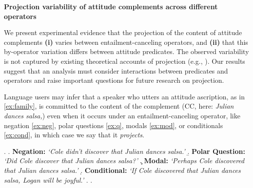 \documentclass[12pt, a4paper]{article}
\begin{document}

\enablehyphenation

\begin{center}
	\textbf{\large%
		Projection variability of attitude complements across different operators}
\end{center}

\vspace{-.8\baselineskip}
\noindent 
	We present experimental evidence that the projection of the content of attitude complements \textbf{(i)} varies between entailment-canceling operators, and \textbf{(ii)} that this by-operator variation differs between attitude predicates.
	The observed variability is not captured by existing theoretical accounts of projection
	(e.g., \citealt{heim_projection_1983,van_der_sandt_presupposition_1992,abrusan_predicting_2011,schlenker_triggering_2021}).
	Our results suggest that an analysis must consider interactions between predicates and operators and raise important questions for future research on projection.

	Language users may infer that a speaker who utters an attitude ascription, as in \ref{ex:family}, is committed to the content of the complement (CC, here: \emph{Julian dances salsa,})
	even when it occurs under an entailment-canceling operator, like negation \ref{ex:neg}, polar questions \ref{ex:q}, modals \ref{ex:mod}, or conditionals \ref{ex:cond}, in which case we say that it \emph{projects}.

	\vspace{-.5\baselineskip}
	\ex. \label{ex:family}
		\a. \label{ex:neg}
			{\bf Negation:} \hfill
			\emph{\lq Cole didn't discover that Julian dances salsa.\rq}
		\b. \label{ex:q}
			{\bf Polar Question:} \hfill
			\emph{\lq Did Cole discover that Julian dances salsa?\rq}
		\c. \label{ex:mod}
			{\bf Modal:} \hfill
			\emph{\lq Perhaps Cole discovered that Julian dances salsa.\rq}
		\d. \label{ex:cond}
			{\bf Conditional:} \hfill
			\emph{\lq If Cole discovered that Julian dances salsa, Logan will be joyful.\rq}
		\z.
	\z.
	
\end{document}
